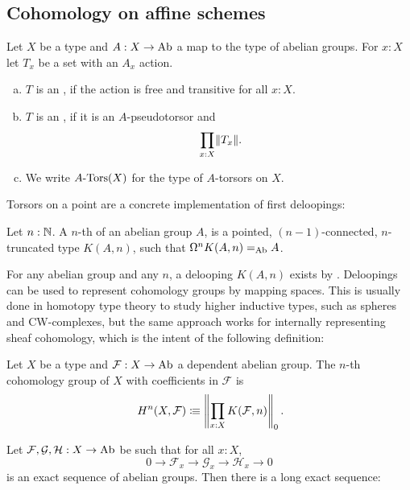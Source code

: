 \subsection{Cohomology on affine schemes}

\begin{definition}%
  \label{torsor}
  Let $X$ be a type and $A:X\to \operatorname{Ab}$ a map to the type of abelian groups.
  For $x:X$ let $T_x$ be a set with an $A_x$ action.
  \begin{enumerate}[(a)]
  \item $T$ is an , if the action is free and transitive for all $x:X$.
  \item $T$ is an , if it is an $A$-pseudotorsor and
    \[ \prod_{x:X} \propTrunc{ T_x } \rlap{.}\]
  \item We write $A\text{-}\mathrm{Tors}(X)$ for the type of $A$-torsors on $X$.
  \end{enumerate}
\end{definition}

Torsors on a point are a concrete implementation of first deloopings:

\begin{definition}
  \label{delooping}
  Let $n:\mathbb{N}$.
  A $n$-th  of an abelian group $A$,
  is a pointed, $(n-1)$-connected, $n$-truncated type $K(A,n)$,
  such that $\Omega^nK(A,n)=_{\operatorname{Ab}}A$.
\end{definition}

For any abelian group and any $n$, a delooping $K(A,n)$ exists by \cite{licata-finster}.
Deloopings can be used to represent cohomology groups by mapping spaces.
This is usually done in homotopy type theory to study higher inductive types, such as spheres and CW-complexes,
but the same approach works for internally representing sheaf cohomology,
which is the intent of the following definition:

\begin{definition}
  \label{cohomology}
  Let $X$ be a type and $\mathcal F:X\to\operatorname{Ab}$ a dependent abelian group.
  The $n$-th cohomology group of $X$ with coefficients in $\mathcal F$ is
  \[
    H^n(X,\mathcal F)\colonequiv \left\propTrunc{\prod_{x:X}K(\mathcal F,n)\right}_0\rlap{.}
  \]
\end{definition}

\begin{theorem}%
  \label{cohomology-les}
  Let $\mathcal F,\mathcal G,\mathcal H:X\to \operatorname{Ab}$ be such that for all $x:X$,
  \[
    0\to \mathcal F_x\to\mathcal G_x\to\mathcal H_x\to 0
  \]
  is an exact sequence of abelian groups. Then there is a long exact sequence:
  \begin{center}
  \end{center}
\end{theorem}

